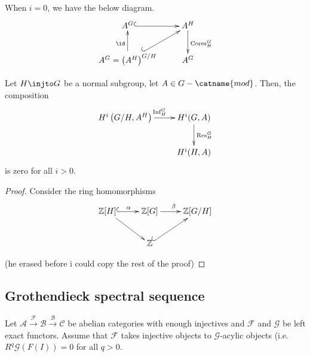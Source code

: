\documentclass[12pt]{scrartcl}
\begin{document}
When $i =0$, we have the below diagram.
\[
\xymatrix{
	A^G \ar@{^{(}->}[r] & A^H \ar[d]^{\text{Cores}_H^G} \\
	A^G = \left(A^H\right)^{G/H} \ar@{^{(}->}[ur] \ar[u]^{\id} & A^G \\
}
\]

\begin{proposition}
	Let $H \injto G$ be a normal subgroup, let $A \in G-\catname{mod}$.
	Then, the composition 
	\[
		\xymatrix{
	H^i \left(G/H, A^H\right) \ar[r]^{\text{Inf}_H^G} & H^i(G, A) \ar[d]^{\text{Res}_H^G} \\
						  & H^i(H, A) \\
					  }
	\]
	is zero for all $i>0$. 
\end{proposition}
\begin{proof}
Consider the ring homomorphisms
\[
\xymatrix{
	\mathbb{Z}[H] \ar@{^{(}->}[r]^{\alpha} \ar[dr]& \mathbb{Z}[G] \ar[r]^{\beta}& \mathbb{Z}[G/H] \\
					      & \mathbb{Z} \ar@{^{(}->}[ur] & \\ 
}
\]

(he erased before i could copy the rest of the proof)
\end{proof}

\subsection{Grothendieck spectral sequence}

Let $\mathscr{A} \xrightarrow{\mathcal{F}} \mathscr{B} \xrightarrow{\mathcal{B}} \mathscr{C}$ be abelian categories with enough injectives and $\mathcal{F}$ and $\mathcal{G}$ be left exact functors.
Assume that $\mathcal{F}$ takes injective objects to $\mathcal{G}$-acylic objects (i.e. $R^q \mathcal{G}(F(I)) = 0 $ for all $q>0$.
\end{document}
